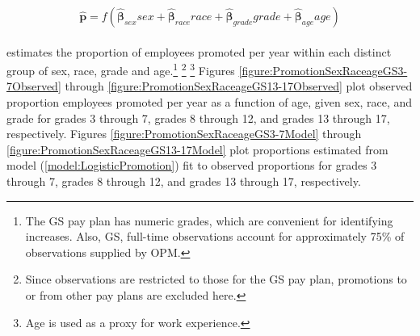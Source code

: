 \documentclass[10pt, letterpaper]{article}
\newcommand{\mest}[1]{\hat{\bm{#1}}}
\begin{document}
\begin{spacing}{1.0}
\begin{equation} \mest{p}=f(\mest{\beta}_{sex}sex+\mest{\beta}_{race}race+\mest{\beta}_{grade}grade+\mest{\beta}_{age}age)
\label{model:LogisticPromotion}
\end{equation}\\[-20pt]

estimates the proportion of employees promoted per year within each distinct group of sex, race, grade and age.\footnote{The GS pay plan has numeric grades, which are convenient for identifying increases.  Also, GS, full-time observations account for approximately 75\% of observations supplied by OPM.} \footnote{Since observations are restricted to those for the GS pay plan, promotions to or from other pay plans are excluded here.} \footnote{Age is used as a proxy for work experience.}  Figures \ref{figure:PromotionSexRaceageGS3-7Observed} through \ref{figure:PromotionSexRaceageGS13-17Observed} plot observed proportion employees promoted per year as a function of age, given sex, race, and grade for grades 3 through 7, grades 8 through 12, and grades 13 through 17, respectively.  Figures \ref{figure:PromotionSexRaceageGS3-7Model} through \ref{figure:PromotionSexRaceageGS13-17Model} plot proportions estimated from model (\ref{model:LogisticPromotion}) fit to observed proportions for grades 3 through 7, grades 8 through 12, and grades 13 through 17, respectively.\\


\end{spacing}
\end{document}
